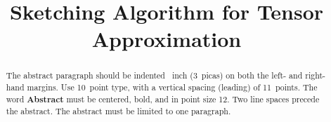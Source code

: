 \documentclass{article}
\title{Sketching Algorithm for Tensor Approximation}
\author{
}
\numberwithin{equation}{section}
\theoremstyle{plain}
\begin{document}

\maketitle


\begin{abstract}
  The abstract paragraph should be indented ~inch
  (3~picas) on both the left- and right-hand margins. Use 10~point
  type, with a vertical spacing (leading) of 11~points.  The word
  \textbf{Abstract} must be centered, bold, and in point size 12. Two
  line spaces precede the abstract. The abstract must be limited to
  one paragraph.
\end{abstract}


\renewcommand{\algorithmicrequire}{\textbf{Input:}}
\renewcommand{\algorithmicensure}{\textbf{Output:}}






\newpage


\newpage 
 
\end{document}
